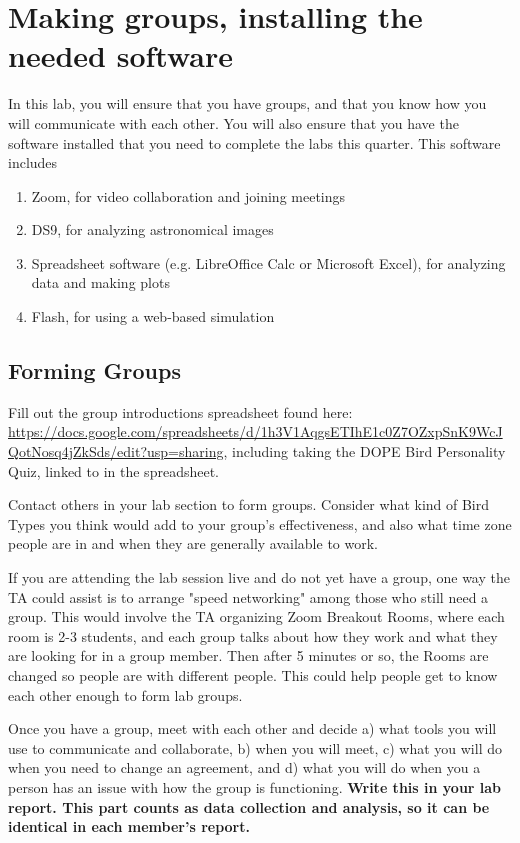 \chapter{Making groups, installing the needed software}

In this lab, you will ensure that you have groups, and that you know how you will communicate with each other. You will also ensure that you have the software installed that you need to complete the labs this quarter. This software includes
\begin{enumerate}
	\item Zoom, for video collaboration and joining meetings
	\item DS9, for analyzing astronomical images
	\item Spreadsheet software (e.g. LibreOffice Calc or Microsoft Excel), for analyzing data and making plots
	\item Flash, for using a web-based simulation
\end{enumerate}

\section{Forming Groups}

\begin{steps}
 \item Fill out the group introductions spreadsheet found here: \url{https://docs.google.com/spreadsheets/d/1h3V1AqgsETIhE1c0Z7OZxpSnK9WcJQotNosq4jZkSds/edit?usp=sharing}, including taking the DOPE Bird Personality Quiz, linked to in the spreadsheet.
 
 \item Contact others in your lab section to form groups. Consider what kind of Bird Types you think would add to your group's effectiveness, and also what time zone people are in and when they are generally available to work.
\end{steps}

If you are attending the lab session live and do not yet have a group, one way the TA could assist is to arrange "speed networking" among those who still need a group. This would involve the TA organizing Zoom Breakout Rooms, where each room is 2-3 students, and each group talks about how they work and what they are looking for in a group member. Then after 5 minutes or so, the Rooms are changed so people are with different people. This could help people get to know each other enough to form lab groups.

\begin{steps}
	\item Once you have a group, meet with each other and decide a) what tools you will use to communicate and collaborate, b) when you will meet, c) what you will do when you need to change an agreement, and d) what you will do when you a person has an issue with how the group is functioning. \textbf{Write this in your lab report. This part counts as data collection and analysis, so it can be identical in each member's report.}
\end{steps}

